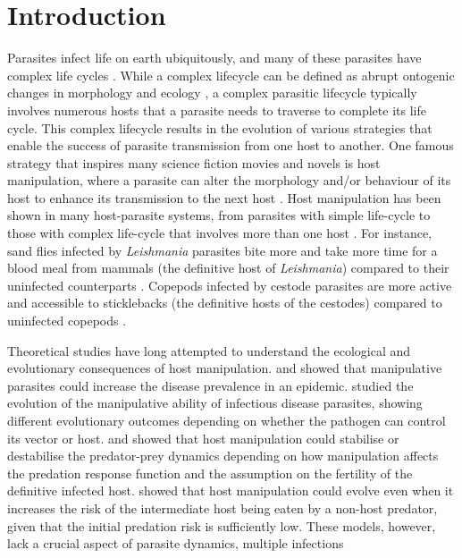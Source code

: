 \documentclass[a4paper]{scrartcl} %
\providecommand{\DIFaddbegin}{} %
\providecommand{\DIFaddend}{} %
\providecommand{\DIFdelbegin}{} %
\providecommand{\DIFdelend}{} %
\newcommand{\DIFscaledelfig}{0.5}
\newlength{\DIFdelgraphicswidth} %
\newlength{\DIFdelgraphicsheight} %
\newcommand{\DIFaddincludegraphics}[2][]{{\color{blue}\fbox{\DIFOincludegraphics[#1]{#2}}}} %
\newcommand{\DIFdelincludegraphics}[2][]{%
\sbox{\DIFdelgraphicsbox}{\DIFOincludegraphics[#1]{#2}}%
\settoboxwidth{\DIFdelgraphicswidth}{\DIFdelgraphicsbox} %
\settoboxtotalheight{\DIFdelgraphicsheight}{\DIFdelgraphicsbox} %
\scalebox{\DIFscaledelfig}{%
\parbox[b]{\DIFdelgraphicswidth}{\usebox{\DIFdelgraphicsbox}\\[-\baselineskip] \rule{\DIFdelgraphicswidth}{0em}}\llap{\resizebox{\DIFdelgraphicswidth}{\DIFdelgraphicsheight}{%
\setlength{\unitlength}{\DIFdelgraphicswidth}%
\begin{picture}(1,1)%
\thicklines\linethickness{2pt} %
{\color[rgb]{1,0,0}\put(0,0){\framebox(1,1){}}}%
{\color[rgb]{1,0,0}\put(0,0){\line( 1,1){1}}}%
{\color[rgb]{1,0,0}\put(0,1){\line(1,-1){1}}}%
\end{picture}%
}\hspace*{3pt}}} %
} %
\DeclareRobustCommand{\DIFaddbegin}{\DIFOaddbegin \let\includegraphics\DIFaddincludegraphics} %
\DeclareRobustCommand{\DIFaddend}{\DIFOaddend \let\includegraphics\DIFOincludegraphics} %
\DeclareRobustCommand{\DIFdelbegin}{\DIFOdelbegin \let\includegraphics\DIFdelincludegraphics} %
\DeclareRobustCommand{\DIFdelend}{\DIFOaddend \let\includegraphics\DIFOincludegraphics} %
\begin{document}
\DIFdelbegin %
\DIFdelend \DIFaddbegin \sffamily
\DIFaddend 

\section*{Introduction}


Parasites infect life on earth ubiquitously, and many of these parasites have complex life cycles \citep{zimmer:book:2001}. 
While a complex lifecycle can be defined as abrupt ontogenic changes in morphology and ecology \citep{Benesh:2016dj}, a complex parasitic lifecycle typically involves numerous hosts that a parasite needs to traverse to complete its life cycle. 
This complex lifecycle results in the evolution of various strategies that enable the success of parasite transmission from one host to another. 
One famous strategy that inspires many science fiction movies and novels is host manipulation, where a parasite can alter the morphology and/or behaviour of its  host to enhance its transmission to the next host \citep{Hughes2012}. 
Host manipulation has been shown in many host-parasite systems, from parasites with simple life-cycle to those with complex life-cycle that involves more than one host \citep{Hughes2012,molyneux_jefferies1986}. 
For instance, sand flies infected by \textit{Leishmania} parasites bite more and take more time for a blood meal from mammals (the definitive host of \textit{Leishmania}) compared to their uninfected counterparts \citep{Rogers2007}. 
Copepods infected by cestode parasites are more active and accessible to sticklebacks (the definitive hosts of the cestodes) compared to uninfected copepods \citep{Wedekind1996}.

Theoretical studies have long attempted to understand the ecological and evolutionary consequences of host manipulation. 
\cite{Roosien2013} and \cite{Hosack2008} showed that manipulative parasites could increase the disease prevalence in an epidemic. \cite{Gandon2018} studied the evolution of the manipulative ability of infectious disease parasites, showing different evolutionary outcomes depending on whether the pathogen can control its vector or host.
\cite{Hadeler1989, Fenton2006} and \cite{Rogawa2018} showed that host manipulation could stabilise or destabilise the predator-prey dynamics depending on how manipulation affects the predation response function and the assumption on the fertility of the definitive infected host. \cite{Seppl2008} showed that host manipulation could evolve even when it increases the risk of the intermediate host being eaten by a non-host predator, given that the initial predation risk is sufficiently low. 
These models, however, lack a crucial aspect of parasite dynamics, multiple infections \citep{kalbe:JFB:2002} 
\end{document}
